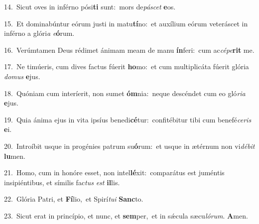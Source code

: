 {\numbfont\textcolor{\numbcolor}{14.}}~Sicut oves in inférno pósi\textbf{ti} sunt:~\star mors de\-\textit{pá}\-\textit{scet} \textbf{e}\-os.\par
{\numbfont\textcolor{\numbcolor}{15.}}~Et dominabúntur eórum justi in matu\-\textbf{tí}\-no:~\star et auxílium eórum veteráscet in inférno a glóri\textit{a} \textit{e}\-\textbf{ó}rum.\par
{\numbfont\textcolor{\numbcolor}{16.}}~Verúmtamen Deus rédimet ánimam meam de manu \textbf{ín}\-feri:~\star cum ac\-\textit{cé}\-\textit{pe}\textbf{rit} me.\par
{\numbfont\textcolor{\numbcolor}{17.}}~Ne timúeris, cum dives factus fúerit \textbf{ho}\-mo:~\star et cum multiplicáta fúerit glória \textit{do}\-\textit{mus} \textbf{e}\-jus.\par
{\numbfont\textcolor{\numbcolor}{18.}}~Quóniam cum interíerit, non sumet \textbf{óm}\-nia:~\star neque descéndet cum eo gló\-\textit{ri}\-\textit{a} \textbf{e}\-jus.\par
{\numbfont\textcolor{\numbcolor}{19.}}~Quia ánima ejus in vita ipsíus benedi\-\textbf{cé}\-tur:~\star confitébitur tibi cum benefé\-\textit{ce}\-\textit{ris} \textbf{e}\-i.\par
{\numbfont\textcolor{\numbcolor}{20.}}~Introíbit usque in progénies patrum su\-\textbf{ó}\-rum:~\star et usque in ætérnum non vi\-\textit{dé}\-\textit{bit} \textbf{lu}\-men.\par
{\numbfont\textcolor{\numbcolor}{21.}}~Homo, cum in honóre esset, non intel\-\textbf{lé}\-xit:~\star comparátus est juméntis insipiéntibus, et símilis fac\textit{tus} \textit{est} \textbf{il}\-lis.\par
{\numbfont\textcolor{\numbcolor}{22.}}~Glória Patri, et \textbf{Fí}\-lio,~\star et Spirí\-\textit{tu}\-\textit{i} \textbf{Sanc}\-to.\par
{\numbfont\textcolor{\numbcolor}{23.}}~Sicut erat in princípio, et nunc, et \textbf{sem}\-per,~\star et in sǽcula sæcu\-\textit{ló}\-\textit{rum}. \textbf{A}\-men.\par
